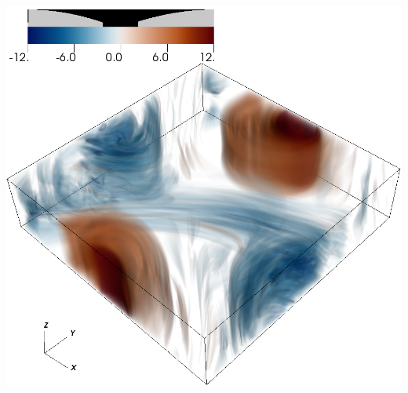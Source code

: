 \documentclass[30pt, blockverticalspace=1cm]{tikzposter}
\begin{document}
\begin{columns}
{\begin{center}
        \vspace{10pt}
        \includegraphics[width=.85\linewidth]{images/vortz_Om10_vr2.png}
    \emp


\end{center}}
\end{columns}
\end{document}
